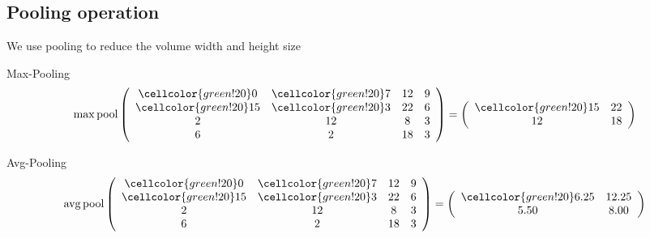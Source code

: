 \subsection{Pooling operation}
\begin{frame}{\insertsubsec}
    We use pooling to reduce the volume width and height size
    \begin{block}{Max-Pooling}
        \begin{align*}
            \operatorname{max\,pool}
            \left(
            \begin{array}{cccc}
                \cellcolor{green!20} 0 & \cellcolor{green!20} 7 & 12 &  9 \\
                \cellcolor{green!20}15 & \cellcolor{green!20} 3 & 22 &  6 \\
                 2 & 12 &  8 &  3 \\
                 6 &  2 & 18 &  3 \\
            \end{array}
            \right)
            =
            \left(
            \begin{array}{cc}
                \cellcolor{green!20}15 & 22 \\
                12 & 18
            \end{array}
            \right)
        \end{align*}
    \end{block}

    \begin{block}{Avg-Pooling}
        \begin{align*}
            \operatorname{avg\,pool}
            \left(
            \begin{array}{cccc}
                \cellcolor{green!20} 0 & \cellcolor{green!20} 7 & 12 &  9 \\
                \cellcolor{green!20}15 & \cellcolor{green!20} 3 & 22 &  6 \\
                 2 & 12 &  8 &  3 \\
                 6 &  2 & 18 &  3 \\
            \end{array}
            \right)
            =
            \left(
            \begin{array}{cc}
                \cellcolor{green!20}6.25 & 12.25 \\
                5.50 & 8.00
            \end{array}
            \right)
        \end{align*}
    \end{block}
\end{frame}


